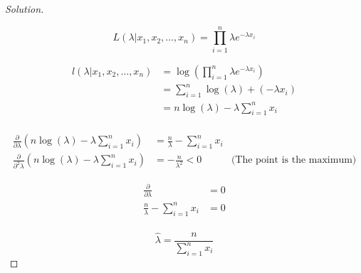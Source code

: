 \documentclass{article}
\newenvironment{solution}
  {\renewcommand\qedsymbol{$\blacksquare$}\begin{proof}[Solution]$ $}
  {\end{proof}}
\begin{document}
\begin{Exercise}
    \begin{solution}

        \[
            L(\lambda|x_1, x_2, \ldots, x_n) = \prod_{i=1}^{n}\lambda e^{-\lambda x_i}
        \]

        \begin{align*}
            l(\lambda|x_1, x_2, \ldots, x_n) & = \log(\prod_{i=1}^{n}\lambda e^{-\lambda x_i}) \\
                                             & = \sum_{i=1}^{n}\log(\lambda) + (-\lambda x_i)  \\
                                             & = n\log(\lambda) - \lambda\sum_{i=1}^{n}x_i     \\
        \end{align*}

        \begin{align*}
            \frac{\partial}{\partial \lambda}(n\log(\lambda) - \lambda\sum_{i=1}^{n}x_i)
             & = \frac{n}{\lambda} - \sum_{i=1}^{n} x_i                                     \\
            \frac{\partial}{\partial^2 \lambda}(n\log(\lambda) - \lambda\sum_{i=1}^{n}x_i)
             & = -\frac{n}{\lambda^2} < 0               & \text{(The point is the maximum)}
        \end{align*}

        \begin{align*}
            \frac{\partial}{\partial \lambda}      & = 0 \\
            \frac{n}{\lambda} - \sum_{i=1}^{n} x_i & = 0 \\
        \end{align*}

        \[\hat \lambda                           = \frac{n}{\sum_{i=1}^{n}x_i}\]
    \end{solution}
\end{Exercise}
\pagebreak
\end{document}
